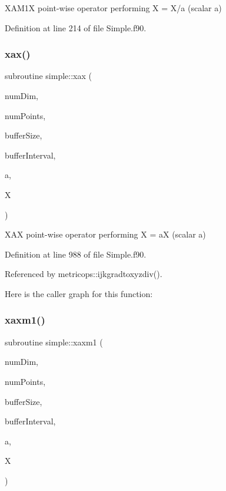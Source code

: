 X\+A\+M1X point-\/wise operator performing X = X/a (scalar a) 



Definition at line 214 of file Simple.\+f90.

\hypertarget{namespacesimple_a885715b34b34c0dd5cf858ecf44f999c}{}\label{namespacesimple_a885715b34b34c0dd5cf858ecf44f999c} 
\subsubsection{\texorpdfstring{xax()}{xax()}}
{\footnotesize\ttfamily subroutine simple\+::xax (\begin{DoxyParamCaption}\item[{integer(kind=4), intent(in)}]{num\+Dim,  }\item[{integer(kind=8), intent(in)}]{num\+Points,  }\item[{integer(kind=8), dimension(numdim), intent(in)}]{buffer\+Size,  }\item[{integer(kind=8), dimension(2$\ast$numdim), intent(in)}]{buffer\+Interval,  }\item[{real(kind=8), intent(in)}]{a,  }\item[{real(kind=8), dimension(numpoints), intent(inout)}]{X }\end{DoxyParamCaption})}



X\+AX point-\/wise operator performing X = aX (scalar a) 



Definition at line 988 of file Simple.\+f90.



Referenced by metricops\+::ijkgradtoxyzdiv().

Here is the caller graph for this function\+:
\hypertarget{namespacesimple_afa8cfa341f0f971f207fa48da17600ea}{}\label{namespacesimple_afa8cfa341f0f971f207fa48da17600ea} 
\subsubsection{\texorpdfstring{xaxm1()}{xaxm1()}}
{\footnotesize\ttfamily subroutine simple\+::xaxm1 (\begin{DoxyParamCaption}\item[{integer(kind=4), intent(in)}]{num\+Dim,  }\item[{integer(kind=8), intent(in)}]{num\+Points,  }\item[{integer(kind=8), dimension(numdim), intent(in)}]{buffer\+Size,  }\item[{integer(kind=8), dimension(2$\ast$numdim), intent(in)}]{buffer\+Interval,  }\item[{real(kind=8), intent(in)}]{a,  }\item[{real(kind=8), dimension(numpoints), intent(inout)}]{X }\end{DoxyParamCaption})}




